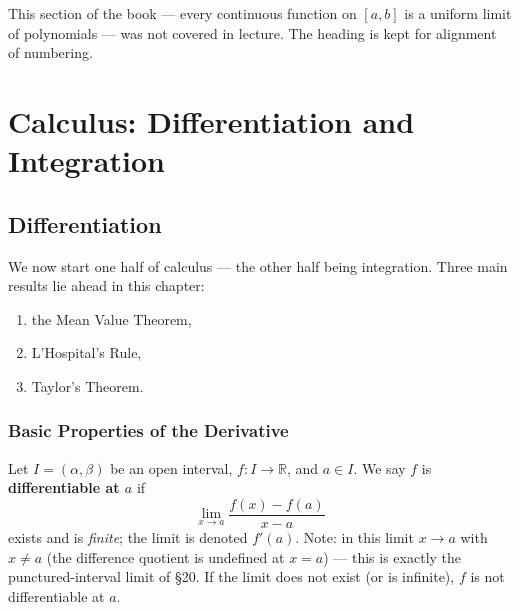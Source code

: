 \documentclass[11pt]{report}
\begin{document}
This section of the book --- every continuous function on $[a,b]$ is a uniform limit of polynomials --- was not covered in lecture. The heading is kept for alignment of numbering.


\part{Calculus: Differentiation and Integration}


\chapter{Differentiation}

We now start one half of calculus --- the other half being integration. Three main results lie ahead in this chapter:
\begin{enumerate}[label=(\arabic*)]
    \item the Mean Value Theorem,
    \item L'Hospital's Rule,
    \item Taylor's Theorem.
\end{enumerate}


\section{Basic Properties of the Derivative}

\begin{defbox}
Let $I = (\alpha, \beta)$ be an open interval, $f: I \to \mathbb{R}$, and $a \in I$. We say $f$ is \textbf{differentiable at $a$} if
\[
\lim_{x \to a} \frac{f(x) - f(a)}{x - a}
\]
exists and is \emph{finite}; the limit is denoted $f'(a)$. Note: in this limit $x \to a$ with $x \neq a$ (the difference quotient is undefined at $x = a$) --- this is exactly the punctured-interval limit of \S 20. If the limit does not exist (or is infinite), $f$ is not differentiable at $a$.
\end{defbox}
\end{document}
